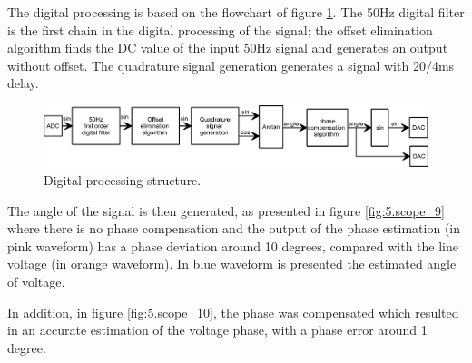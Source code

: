 	The digital processing is based on the flowchart of figure \ref{fig:5.processingArchitecture}.	
	The 50Hz digital filter is the first chain in the digital processing of the signal; the offset elimination algorithm finds the DC value of the input 50Hz signal and generates an output without offset. 
	The quadrature signal generation generates a signal with 20/4ms delay.
	
	\begin{figure}[h!]
		\centering
		\includegraphics[width=\textwidth,keepaspectratio]{figures/50.PreliminaryW/processingArchitecture}
		\caption{Digital processing structure.}
		\label{fig:5.processingArchitecture}
	\end{figure}

 
	
	The angle of the signal is then generated, as presented in figure \ref{fig:5.scope_9} where there is no phase compensation and the output of the phase estimation (in pink waveform) has a phase deviation around 10 degrees, compared with the line voltage (in orange waveform). In blue waveform is presented the estimated angle of voltage.
	
	In addition, in figure \ref{fig:5.scope_10}, the phase was compensated which resulted in an accurate estimation of the voltage phase, with a phase error around 1 degree.
	
